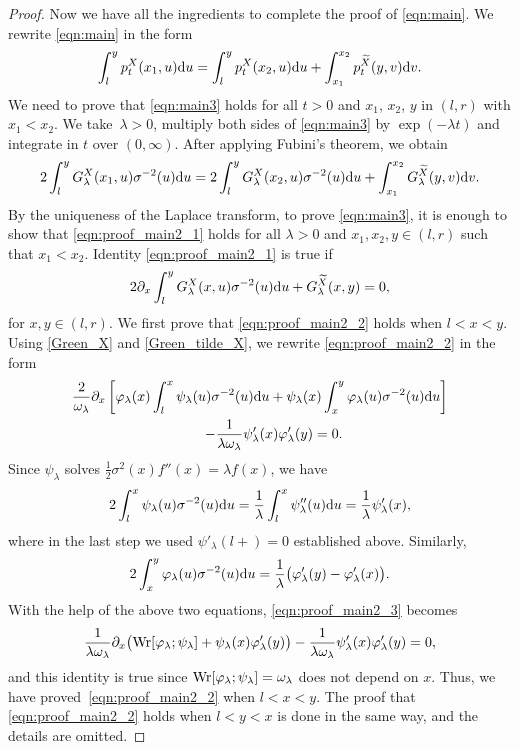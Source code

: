 \documentclass[10pt,a4paper]{amsart}
\numberwithin{equation}{section}
\theoremstyle{definition}
\def\wr{{\textnormal{Wr}}}
\def\d{{\textnormal d}}
\begin{document}
\begin{proof}
Now we have all the ingredients to complete the proof of \eqref{eqn:main}.
We rewrite
\eqref{eqn:main} in the form
\begin{gather}\label{eqn:main3}
\int_l^y p^X_t(x_1,u) \d u=\int_l^y p^X_t(x_2,u) \d u+\int_{x_1}^{x_2} p^{\widetilde X}_t(y,v) \d v.
\end{gather}
We need to prove that \eqref{eqn:main3} holds for all $t>0$ and $x_1$, $x_2$, $y$ in $(l,r)$ with $x_1<x_2$. We take~${\lambda>0}$, multiply both sides of
\eqref{eqn:main3} by $\exp(-\lambda t)$ and integrate in $t$ over $(0,\infty)$. After applying Fubini's theorem, we obtain
\begin{equation}\label{eqn:proof_main2_1}
 2 \int_l^y G^X_{\lambda}(x_1,u)
 \sigma^{-2}(u)\d u
 = 2 \int_l^y G^X_{\lambda}(x_2,u)
 \sigma^{-2}(u)\d u +\int_{x_1}^{x_2} G^{\widetilde X}_{\lambda}(y,v) \d v.
\end{equation}
By the uniqueness of the Laplace transform, to prove \eqref{eqn:main3}, it is enough to show that \eqref{eqn:proof_main2_1} holds for all $\lambda>0$ and $x_1,x_2,y \in (l,r)$ such that $x_1<x_2$. Identity \eqref{eqn:proof_main2_1} is true if
\begin{equation}\label{eqn:proof_main2_2}
 2 \partial_x \int_l^y G^X_{\lambda}(x,u) \sigma^{-2}(u)\d u + G^{\widetilde X}_{\lambda}(x,y)=0,
\end{equation}
for $x,y \in (l,r)$. We first prove that \eqref{eqn:proof_main2_2} holds when $l<x<y$. Using \eqref{Green_X} and \eqref{Green_tilde_X},
we rewrite \eqref{eqn:proof_main2_2} in the form
\begin{gather}
\frac{2}{\omega_{\lambda}}
\partial_x \left[ \varphi_{\lambda}(x) \int_l^x \psi_{\lambda}(u) \sigma^{-2}(u) \d u+ \psi_{\lambda}(x) \int_x^y \varphi_{\lambda}(u) \sigma^{-2}(u) \d u \right]
\nonumber\\
\qquad- \frac{1}{\lambda \omega_{\lambda}} \psi'_{\lambda}(x) \varphi'_{\lambda}(y)=0.\label{eqn:proof_main2_3}
\end{gather}
Since $\psi_{\lambda}$ solves $\tfrac{1}{2} \sigma^2(x) f''(x)=\lambda f(x)$, we have
\[
2\int_l^x \psi_{\lambda}(u) \sigma^{-2}(u) \d u=\frac{1}{\lambda}
\int_l^x \psi''_{\lambda}(u) \d u=\frac{1}{\lambda} \psi'_{\lambda}(x),
\]
where in the last step we used $\psi'_{\lambda}(l+)=0$ established above. Similarly,
\[
2 \int_x^y \varphi_{\lambda}(u) \sigma^{-2}(u) \d u=\frac{1}{\lambda}
\bigl( \varphi'_{\lambda}(y)-\varphi'_{\lambda}(x)\bigr).
\]
With the help of the above two equations, \eqref{eqn:proof_main2_3} becomes
\[
\frac{1}{\lambda \omega_{\lambda}}
\partial_x \bigl( \wr[\varphi_{\lambda}; \psi_{\lambda}] +
\psi_{\lambda}(x) \varphi'_{\lambda}(y) \bigr) - \frac{1}{\lambda \omega_{\lambda}}
\psi'_{\lambda}(x) \varphi'_{\lambda}(y)=0,
\]
and this identity is true since $\wr[\varphi_{\lambda}; \psi_{\lambda}]=\omega_{\lambda}$ does not depend on $x$. Thus, we have proved~\eqref{eqn:proof_main2_2} when $l<x<y$. The proof that \eqref{eqn:proof_main2_2} holds when $l<y< x$ is done in the same way, and the details are omitted.


\end{proof}
\end{document}
